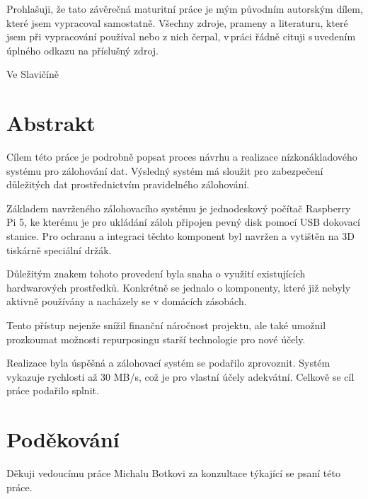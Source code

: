 \documentclass[a4paper,12pt, oneside]{book}
\makeatletter
\let\newauthor\@author
\let\newdate\@date
\makeatother
\begin{document}
\newpage
\mbox{}
\newpage


\noindent

Prohlašuji, že tato závěrečná maturitní práce je mým původním autorským dílem, které jsem vypracoval samostatně. Všechny zdroje, prameny a literaturu, které jsem při vypracování používal nebo z nich čerpal, v práci řádně cituji s uvedením úplného odkazu na příslušný zdroj.

\begin{center}
Ve Slavičíně

\newdate

\vspace{10mm}

\newauthor
\end{center}

\newpage
\section*{Abstrakt}

Cílem této práce je podrobně popsat proces návrhu a realizace nízkonákladového
systému pro zálohování dat.  Výsledný systém má sloužit pro zabezpečení důležitých
dat prostřednictvím pravidelného zálohování.

Základem navrženého zálohovacího systému je jednodeskový počítač Raspberry Pi 5,
ke kterému je pro ukládání záloh připojen pevný disk pomocí USB
dokovací stanice. Pro ochranu a integraci těchto komponent byl navržen a
vytištěn na 3D tiskárně speciální držák. 

Důležitým znakem tohoto provedení byla snaha o využití existujících
hardwarových prostředků. Konkrétně se jednalo o komponenty, které již nebyly
aktivně používány a nacházely se v domácích zásobách.

Tento přístup nejenže snížil finanční náročnost projektu, ale také umožnil
prozkoumat možnosti repurposingu starší technologie pro nové účely.

Realizace byla úspěšná a zálohovací systém se podařilo zprovoznit. Systém
vykazuje rychlosti až 30 MB/s, což je pro vlastní účely adekvátní. Celkově 
se cíl práce podařilo splnit.

\newpage
\section*{Poděkování}

Děkuji vedoucímu práce Michalu Botkovi za konzultace týkající 
se psaní této práce. 

\tableofcontents
\end{document}
